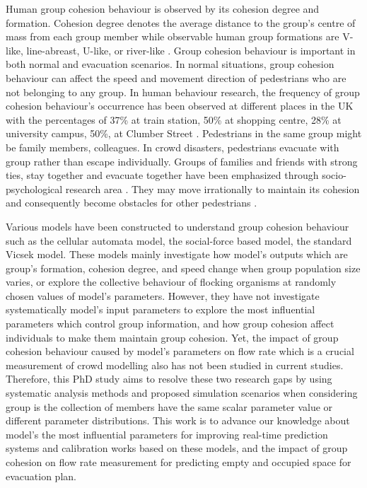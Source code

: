 \documentclass[a4paper,11pt,phdthesis,singlespace,twoside]{cssethesis}
\begin{document}
Human group cohesion behaviour is observed by its cohesion degree and formation. Cohesion degree denotes the average distance to the group’s centre of mass from each group member while observable human group formations are V-like, line-abreast, U-like, or river-like \cite {Helbing2005}. Group cohesion behaviour is important in both normal and evacuation scenarios. In normal situations, group cohesion behaviour can affect the speed and movement direction of pedestrians who are not belonging to any group. In human behaviour research, the frequency of group cohesion behaviour’s occurrence has been observed at different places in the UK with the percentages of 37\% at train station, 50\% at shopping centre, 28\% at university campus, 50\%, at Clumber Street \cite{Singh2009}. Pedestrians in the same group might be family members, colleagues. In crowd disasters, pedestrians evacuate with group rather than escape individually. Groups of families and friends with strong ties, stay together and evacuate together have been emphasized through socio-psychological research area \cite {Mawson2005}. They may move irrationally to maintain its cohesion and consequently become obstacles for other pedestrians \cite{Aguirre2011}.

Various models have been constructed to understand group cohesion behaviour such as the cellular automata model, the social-force based model, the standard Vicsek model. These models mainly investigate how model’s outputs which are group’s formation, cohesion degree, and speed change when group population size varies, or explore the collective behaviour of flocking organisms at randomly chosen values of model’s parameters. However, they have not investigate systematically model’s input parameters to explore the most influential parameters which control group information, and how group cohesion affect individuals to make them maintain group cohesion. Yet, the impact of group cohesion behaviour caused by model’s parameters on flow rate which is a crucial measurement of crowd modelling also has not been studied in current studies. Therefore, this PhD study aims to resolve these two research gaps by using systematic analysis methods and proposed simulation scenarios when considering group is the collection of members have the same scalar parameter value or different parameter distributions. This work is to advance our knowledge about model’s the most influential parameters for improving real-time prediction systems and calibration works based on these models, and the impact of group cohesion on flow rate measurement for predicting empty and occupied space for evacuation plan.
\end{document}
